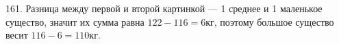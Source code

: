 161. Разница между первой и второй картинкой --- 1 среднее и 1 маленькое существо, значит их сумма равна $122-116=6$кг, поэтому большое существо весит $116-6=110$кг.\\
